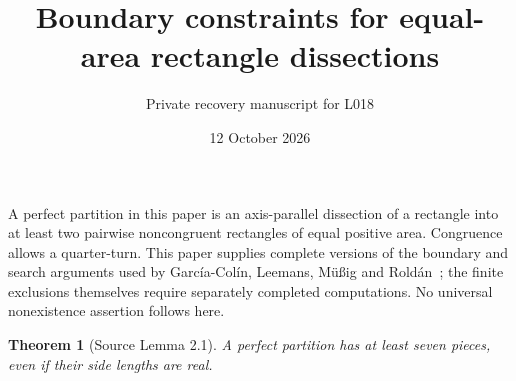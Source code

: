 \documentclass[11pt]{article}
\title{Boundary constraints for equal-area rectangle dissections}
\author{Private recovery manuscript for L018}\date{12 October 2026}
\newtheorem{theorem}{Theorem}\newtheorem{lemma}[theorem]{Lemma}\newtheorem{proposition}[theorem]{Proposition}
\begin{document}
\maketitle
A perfect partition in this paper is an axis-parallel dissection of a rectangle
into at least two pairwise noncongruent rectangles of equal positive area.
Congruence allows a quarter-turn. This paper supplies complete versions of the
boundary and search arguments used by Garc\'ia-Col\'in, Leemans, M\"u\ss ig and
Rold\'an~\cite{source}; the finite exclusions themselves require separately
completed computations. No universal nonexistence assertion follows here.

\begin{theorem}[Source Lemma 2.1]\label{seven}
A perfect partition has at least seven pieces, even if their side lengths are real.
\end{theorem}
\end{document}
